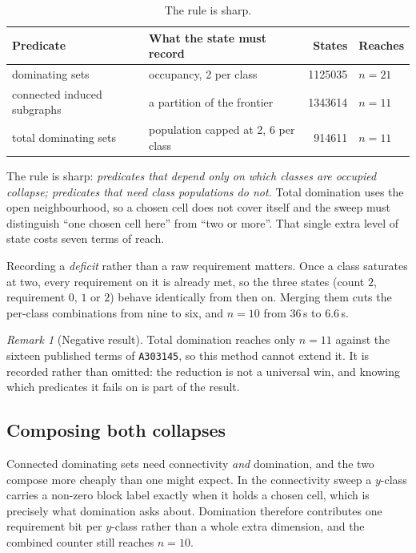 \documentclass[11pt]{article}
\theoremstyle{remark}
\newtheorem{remark}{Remark}
\newcommand{\seq}[1]{\texttt{#1}}
\begin{document}
\begin{table}[h]
\centering
\begin{tabular}{@{}llrl@{}}
\toprule
Predicate & What the state must record & States & Reaches \\
\midrule
dominating sets & occupancy, 2 per class & 1125035 & $n=21$ \\
connected induced subgraphs & a partition of the frontier & 1343614 & $n=11$ \\
total dominating sets & population capped at 2, 6 per class & 914611 & $n=11$ \\
\bottomrule
\end{tabular}
\caption{The rule is sharp.}
\label{tab:regimes}
\end{table}

The rule is sharp: \emph{predicates that depend only on which classes are
occupied collapse; predicates that need class populations do not.} Total
domination uses the open neighbourhood, so a chosen cell does not cover itself
and the sweep must distinguish ``one chosen cell here'' from ``two or more''.
That single extra level of state costs seven terms of reach.

Recording a \emph{deficit} rather than a raw requirement matters. Once a class
saturates at two, every requirement on it is already met, so the three states
(count $2$, requirement $0$, $1$ or $2$) behave identically from then on. Merging
them cuts the per-class combinations from nine to six, and $n=10$ from
$36$\,s to $6.6$\,s.

\begin{remark}[Negative result]
Total domination reaches only $n=11$ against the sixteen published terms of
\seq{A303145}, so this method cannot extend it. It is recorded rather than
omitted: the reduction is not a universal win, and knowing which predicates it
fails on is part of the result.
\end{remark}

\subsection{Composing both collapses}

Connected dominating sets need connectivity \emph{and} domination, and the two
compose more cheaply than one might expect. In the connectivity sweep a
$y$-class carries a non-zero block label exactly when it holds a chosen cell,
which is precisely what domination asks about. Domination therefore contributes
one requirement bit per $y$-class rather than a whole extra dimension, and the
combined counter still reaches $n=10$.
\end{document}
